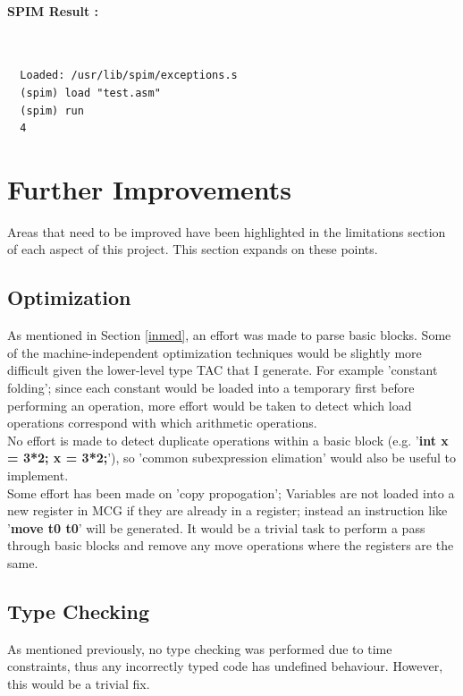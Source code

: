 \documentclass[12pt]{article}
\begin{document}
\paragraph{SPIM Result :}~\\
\begin{lstlisting}
  Loaded: /usr/lib/spim/exceptions.s
  (spim) load "test.asm"
  (spim) run
  4
\end{lstlisting}
\section{Further Improvements }
Areas that need to be improved have been highlighted in the limitations section of each aspect of this project. This section expands on these points. 
\subsection{Optimization}
As mentioned in Section \ref{inmed}, an effort was made to parse basic blocks. Some of the machine-independent optimization techniques would be slightly more difficult given the lower-level type TAC that I generate. For example 'constant folding'; since each constant would be loaded into a temporary first before performing an operation, more effort would be taken to detect which load operations correspond with which arithmetic operations.
\\\newline No effort is made to detect duplicate operations within a basic block (e.g. '\textbf{int x = 3*2; x = 3*2;}'), so 'common subexpression elimation' would also be useful to implement. \\\newline Some effort has been made on 'copy propogation'; Variables are not loaded into a new register in MCG if they are already in a register; instead an instruction like '\textbf{move t0 t0}' will be generated. It would be a trivial task to perform a pass through basic blocks and remove any move operations where the registers are the same. 
\subsection{Type Checking}
As mentioned previously, no type checking was performed due to time constraints, thus any incorrectly typed code has undefined behaviour. However, this would be a trivial fix. 
\end{document}
